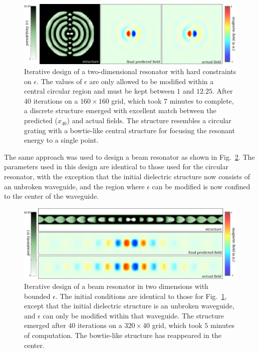 \begin{figure}[htbp]\centering
\includegraphics[width=\textwidth]{p1/circle}
\caption{Iterative design of a two-dimensional resonator 
            with hard constraints on $\epsilon$.
    The values of $\epsilon$ are only allowed to be modified within a central circular region and must be kept between $1$ and $12.25$. 
    After $40$ iterations on a $160 \times 160$ grid, which took $7$ minutes to complete, a discrete structure emerged with excellent match between the predicted ($x_{40}$) and actual fields. 
    The structure resembles a circular grating with a bowtie-like central structure for focusing the resonant energy to a single point.} 
\label{circle pic}
\end{figure}

The same approach was used to design a beam resonator 
    as shown in Fig.~\ref{line pic}. 
The parameters used in this design are identical 
    to those used for the circular resonator, 
    with the exception that the initial dielectric structure 
    now consists of an unbroken waveguide, 
    and the region where $\epsilon$ can be modified is now confined 
    to the center of the waveguide.

\begin{figure}[htbp]\centering
\includegraphics[width=\textwidth]{p1/beam}
\caption{Iterative design of a beam resonator in two dimensions 
        with bounded $\epsilon$. 
    The initial conditions are identical to those for Fig.~\ref{circle pic}, 
        except that the initial dielectric structure is an unbroken waveguide, 
        and $\epsilon$ can only be modified within that waveguide. 
    The structure emerged after $40$ iterations on a $320\times 40$ grid, 
        which took $5$ minutes of computation. 
    The bowtie-like structure has reappeared in the center.}
\label{line pic}
\end{figure}






